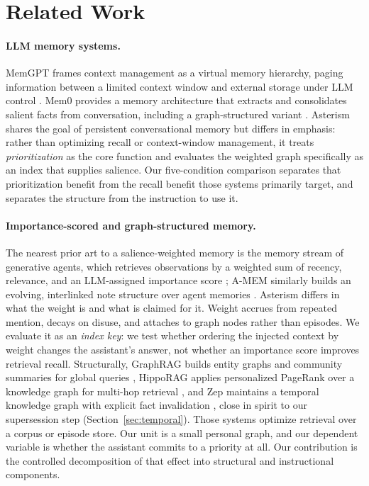 \documentclass[11pt]{article}
\begin{document}
\section{Related Work}
\label{sec:related}

\paragraph{LLM memory systems.} MemGPT frames context management as a virtual memory hierarchy, paging information between a limited context window and external storage under LLM control \citep{packer2023memgpt}. Mem0 provides a memory architecture that extracts and consolidates salient facts from conversation, including a graph-structured variant \citep{chhikara2025mem0}. Asterism shares the goal of persistent conversational memory but differs in emphasis: rather than optimizing recall or context-window management, it treats \emph{prioritization} as the core function and evaluates the weighted graph specifically as an index that supplies salience. Our five-condition comparison separates that prioritization benefit from the recall benefit those systems primarily target, and separates the structure from the instruction to use it.

\paragraph{Importance-scored and graph-structured memory.} The nearest prior art to a salience-weighted memory is the memory stream of generative agents, which retrieves observations by a weighted sum of recency, relevance, and an LLM-assigned importance score \citep{park2023generative}; A-MEM similarly builds an evolving, interlinked note structure over agent memories \citep{xu2025amem}. Asterism differs in what the weight is and what is claimed for it. Weight accrues from repeated mention, decays on disuse, and attaches to graph nodes rather than episodes. We evaluate it as an \emph{index key}: we test whether ordering the injected context by weight changes the assistant's answer, not whether an importance score improves retrieval recall. Structurally, GraphRAG builds entity graphs and community summaries for global queries \citep{edge2024local}, HippoRAG applies personalized PageRank over a knowledge graph for multi-hop retrieval \citep{gutierrez2024hipporag}, and Zep maintains a temporal knowledge graph with explicit fact invalidation \citep{rasmussen2025zep}, close in spirit to our supersession step (Section~\ref{sec:temporal}). Those systems optimize retrieval over a corpus or episode store. Our unit is a small personal graph, and our dependent variable is whether the assistant commits to a priority at all. Our contribution is the controlled decomposition of that effect into structural and instructional components.
\end{document}
